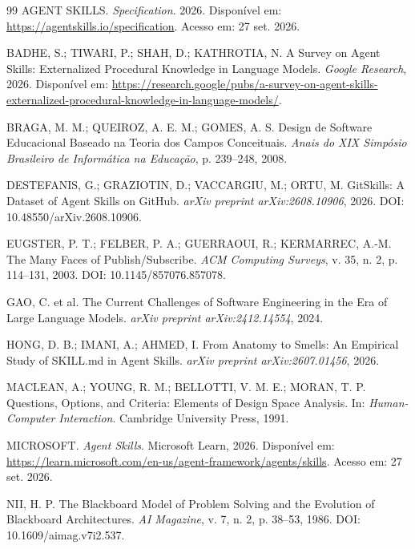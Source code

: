 \documentclass[preprint,12pt,authoryear]{elsarticle}
\begin{document}

\begin{thebibliography}{99}
AGENT SKILLS. \emph{Specification}. 2026. Disponível em: \url{https://agentskills.io/specification}. Acesso em: 27 set. 2026.

BADHE, S.; TIWARI, P.; SHAH, D.; KATHROTIA, N. A Survey on Agent Skills: Externalized Procedural Knowledge in Language Models. \emph{Google Research}, 2026. Disponível em: \url{https://research.google/pubs/a-survey-on-agent-skills-externalized-procedural-knowledge-in-language-models/}.

BRAGA, M. M.; QUEIROZ, A. E. M.; GOMES, A. S. Design de Software Educacional Baseado na Teoria dos Campos Conceituais. \emph{Anais do XIX Simpósio Brasileiro de Informática na Educação}, p. 239--248, 2008.

DESTEFANIS, G.; GRAZIOTIN, D.; VACCARGIU, M.; ORTU, M. GitSkills: A Dataset of Agent Skills on GitHub. \emph{arXiv preprint arXiv:2608.10906}, 2026. DOI: 10.48550/arXiv.2608.10906.

EUGSTER, P. T.; FELBER, P. A.; GUERRAOUI, R.; KERMARREC, A.-M. The Many Faces of Publish/Subscribe. \emph{ACM Computing Surveys}, v. 35, n. 2, p. 114--131, 2003. DOI: 10.1145/857076.857078.

GAO, C. et al. The Current Challenges of Software Engineering in the Era of Large Language Models. \emph{arXiv preprint arXiv:2412.14554}, 2024.

HONG, D. B.; IMANI, A.; AHMED, I. From Anatomy to Smells: An Empirical Study of SKILL.md in Agent Skills. \emph{arXiv preprint arXiv:2607.01456}, 2026.

MACLEAN, A.; YOUNG, R. M.; BELLOTTI, V. M. E.; MORAN, T. P. Questions, Options, and Criteria: Elements of Design Space Analysis. In: \emph{Human-Computer Interaction}. Cambridge University Press, 1991.

MICROSOFT. \emph{Agent Skills}. Microsoft Learn, 2026. Disponível em: \url{https://learn.microsoft.com/en-us/agent-framework/agents/skills}. Acesso em: 27 set. 2026.

NII, H. P. The Blackboard Model of Problem Solving and the Evolution of Blackboard Architectures. \emph{AI Magazine}, v. 7, n. 2, p. 38--53, 1986. DOI: 10.1609/aimag.v7i2.537.


\end{thebibliography}
\end{document}
